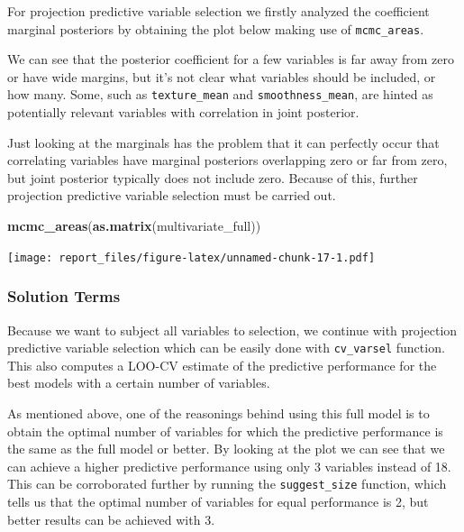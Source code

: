\documentclass[
]{article}
\newenvironment{Shaded}{\begin{snugshade}}{\end{snugshade}}
\newcommand{\KeywordTok}[1]{\textcolor[rgb]{0.13,0.29,0.53}{\textbf{#1}}}
\newcommand{\NormalTok}[1]{#1}
\begin{document}
For projection predictive variable selection we firstly analyzed the
coefficient marginal posteriors by obtaining the plot below making use
of \texttt{mcmc\_areas}.

We can see that the posterior coefficient for a few variables is far
away from zero or have wide margins, but it's not clear what variables
should be included, or how many. Some, such as \texttt{texture\_mean}
and \texttt{smoothness\_mean}, are hinted as potentially relevant
variables with correlation in joint posterior.

Just looking at the marginals has the problem that it can perfectly
occur that correlating variables have marginal posteriors overlapping
zero or far from zero, but joint posterior typically does not include
zero. Because of this, further projection predictive variable selection
must be carried out.

\begin{Shaded}
\begin{Highlighting}[]
\KeywordTok{mcmc_areas}\NormalTok{(}\KeywordTok{as.matrix}\NormalTok{(multivariate_full))}
\end{Highlighting}
\end{Shaded}

\texttt{[image: report\_files/figure-latex/unnamed-chunk-17-1.pdf]}

\hypertarget{solution-terms}{%
\subsubsection{Solution Terms}\label{solution-terms}}

Because we want to subject all variables to selection, we continue with
projection predictive variable selection which can be easily done with
\texttt{cv\_varsel} function. This also computes a LOO-CV estimate of
the predictive performance for the best models with a certain number of
variables.

As mentioned above, one of the reasonings behind using this full model
is to obtain the optimal number of variables for which the predictive
performance is the same as the full model or better. By looking at the
plot we can see that we can achieve a higher predictive performance
using only 3 variables instead of 18. This can be corroborated further
by running the \texttt{suggest\_size} function, which tells us that the
optimal number of variables for equal performance is 2, but better
results can be achieved with 3.
\end{document}
